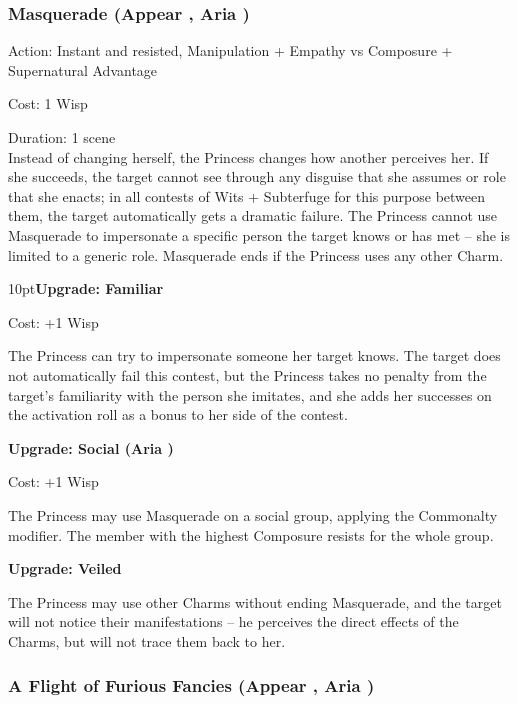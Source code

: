 \subsubsection*{Masquerade (Appear \textbullet\textbullet\textbullet, Aria \textbullet)}
\noindent Action: Instant and resisted, Manipulation + Empathy vs Composure + Supernatural Advantage

\noindent Cost: 1 Wisp

\noindent Duration: 1 scene \\

\noindent Instead of changing herself, the Princess changes how another perceives her. If she succeeds, the target cannot see through any disguise that she assumes or role that she enacts; in all contests of Wits + Subterfuge for this purpose between them, the target automatically gets a dramatic failure. The Princess cannot use Masquerade to impersonate a specific person the target knows or has met -- she is limited to a generic role. Masquerade ends if the Princess uses any other Charm.

\begin{myindentpar}{10pt}\textbf{Upgrade: Familiar}

\noindent Cost: +1 Wisp

The Princess can try to impersonate someone her target knows. The target does not automatically fail this contest, but the Princess takes no penalty from the target's familiarity with the person she imitates, and she adds her successes on the activation roll as a bonus to her side of the contest.

\textbf{Upgrade: Social (Aria \textbullet\textbullet)}

\noindent Cost: +1 Wisp

The Princess may use Masquerade on a social group, applying the Commonalty modifier. The member with the highest Composure resists for the whole group.

\textbf{Upgrade: Veiled}

The Princess may use other Charms without ending Masquerade, and the target will not notice their manifestations -- he perceives the direct effects of the Charms, but will not trace them back to her.\end{myindentpar}

\subsubsection*{A Flight of Furious Fancies (Appear \textbullet\textbullet\textbullet, Aria \textbullet\textbullet\textbullet)}

